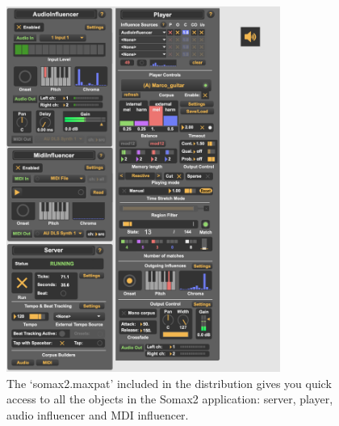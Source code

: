 \begin{figure}[H]
    \centering        
 	\includegraphics[width=0.8\textwidth]{img/somax2.png}
    \caption{The `somax2.maxpat' included in the distribution gives you quick access to all the objects in the Somax2 application: server, player, audio influencer and MDI influencer.}
    \label{fig:somax2_ui}
\end{figure}